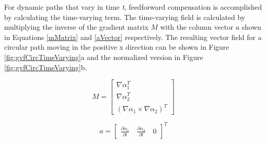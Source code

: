 \documentclass[numbered,pdftex]{ohio-etd}
\begin{document}
For dynamic paths that vary in time \textit{t}, feedforward compensation is accomplished by calculating the time-varying term. The time-varying field is calculated by multiplying the inverse of the gradient matrix $M$ with the column vector $a$ shown in Equations \ref{mMatrix} and \ref{aVector} respectively. The resulting vector field for a circular path moving in the positive x direction can be shown in Figure \ref{fig:gvfCircTimeVarying}a and the normalized version in Figure \ref{fig:gvfCircTimeVarying}b.


\begin{equation}
\label{mMatrix}
M =\begin{bmatrix}
\nabla\alpha_1^T \\
\nabla\alpha_2^T \\
(\nabla\alpha_1 \times \nabla\alpha_2)^T
\end{bmatrix}
\end{equation}

\begin{equation}
\label{aVector}
a =\begin{bmatrix}
\frac{\partial \alpha_1}{\partial t} \quad   \frac{\partial \alpha_2}{\partial t} \quad   0
\end{bmatrix}^T
\end{equation}
\end{document}
